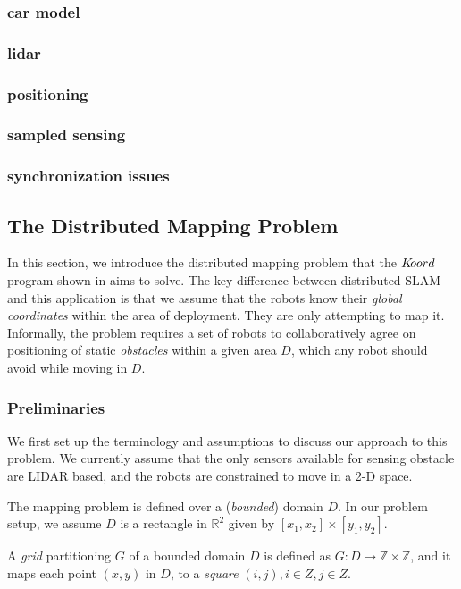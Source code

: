 \subsubsection{car model}
\subsubsection{lidar}
\subsubsection{positioning}
\subsubsection{sampled sensing}
\subsubsection{synchronization issues}
 
\subsection{The Distributed Mapping Problem}
In this section, we introduce the distributed mapping problem that the $K\kern-2pt oord$ program shown in  aims to solve. The key difference between distributed SLAM and this application is that we assume that the robots know their \emph{global coordinates} within the area of deployment. They are only attempting to map it. 
Informally, the problem requires a set of robots to collaboratively agree on positioning of static \emph{obstacles} within a given area $D$, which any robot should avoid while moving in $D$.

\subsubsection{Preliminaries}
We first set up the terminology and assumptions to discuss our approach to this problem. We currently assume that the only sensors available for sensing obstacle are LIDAR based, and the robots are constrained to move in a 2-D space.

The mapping problem is defined over a (\emph{bounded}) domain $D$. In our problem setup, we assume $D$ is a rectangle in $\mathbb{R}^2$ given by $[x_1,x_2]\times [y_1,y_2]$.

\begin{definition}
A \emph{grid} partitioning $G$ of a bounded domain $D$ is defined as $G:D \mapsto \mathbb{Z}\times\mathbb{Z}$, and it maps each point $(x,y)$ in $D$, to a \emph{square} $(i,j), i \in Z, j\in Z$.
\end{definition}


